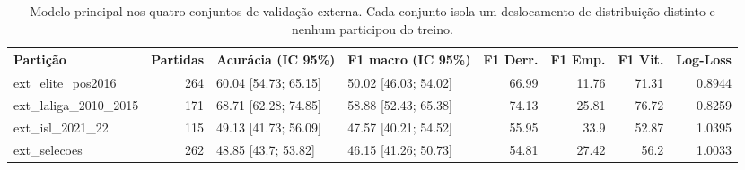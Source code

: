 \begin{table}[htbp]
\centering
\caption{Modelo principal nos quatro conjuntos de validação externa. Cada conjunto isola um deslocamento de distribuição distinto e nenhum participou do treino.}
\label{tab:wp3-externa}
\small
\begin{tabular}{lrllrrrr}
\toprule
Partição & Partidas & Acurácia (IC 95\%) & F1 macro (IC 95\%) & F1 Derr. & F1 Emp. & F1 Vit. & Log-Loss \\
\midrule
ext\_elite\_pos2016 & 264 & 60.04 [54.73; 65.15] & 50.02 [46.03; 54.02] & 66.99 & 11.76 & 71.31 & 0.8944 \\
ext\_laliga\_2010\_2015 & 171 & 68.71 [62.28; 74.85] & 58.88 [52.43; 65.38] & 74.13 & 25.81 & 76.72 & 0.8259 \\
ext\_isl\_2021\_22 & 115 & 49.13 [41.73; 56.09] & 47.57 [40.21; 54.52] & 55.95 & 33.9 & 52.87 & 1.0395 \\
ext\_selecoes & 262 & 48.85 [43.7; 53.82] & 46.15 [41.26; 50.73] & 54.81 & 27.42 & 56.2 & 1.0033 \\
\bottomrule
\end{tabular}
\end{table}
